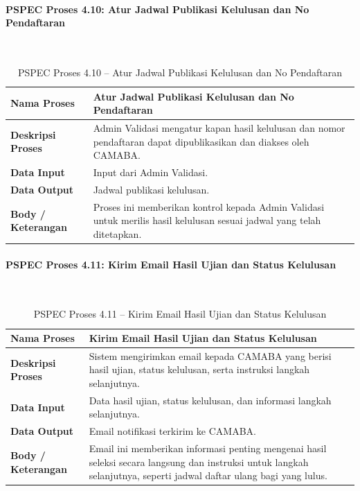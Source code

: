 \paragraph{PSPEC Proses 4.10: Atur Jadwal Publikasi Kelulusan dan No Pendaftaran}~\\
\begin{longtable}{|p{}|p{}|}
\caption{PSPEC Proses 4.10 -- Atur Jadwal Publikasi Kelulusan dan No Pendaftaran}
\label{table:3.pspec410}\\
\hline
\textbf{Nama Proses} & Atur Jadwal Publikasi Kelulusan dan No Pendaftaran \\
\hline
\textbf{Deskripsi Proses} & Admin Validasi mengatur kapan hasil kelulusan dan nomor pendaftaran dapat dipublikasikan dan diakses oleh CAMABA. \\
\hline
\textbf{Data Input} & Input dari Admin Validasi. \\
\hline
\textbf{Data Output} & Jadwal publikasi kelulusan. \\
\hline
\textbf{Body / Keterangan} & Proses ini memberikan kontrol kepada Admin Validasi untuk merilis hasil kelulusan sesuai jadwal yang telah ditetapkan. \\
\hline
\end{longtable}

\paragraph{PSPEC Proses 4.11: Kirim Email Hasil Ujian dan Status Kelulusan}~\\
\begin{longtable}{|p{}|p{}|}
	\caption{PSPEC Proses 4.11 -- Kirim Email Hasil Ujian dan Status Kelulusan}
	\label{table:3.pspec411}\\
	\hline
	\textbf{Nama Proses} & Kirim Email Hasil Ujian dan Status Kelulusan \\
	\hline
	\textbf{Deskripsi Proses} & Sistem mengirimkan email kepada CAMABA yang berisi hasil ujian, status kelulusan, serta instruksi langkah selanjutnya. \\
	\hline
	\textbf{Data Input} & Data hasil ujian, status kelulusan, dan informasi langkah selanjutnya. \\
	\hline
	\textbf{Data Output} & Email notifikasi terkirim ke CAMABA. \\
	\hline
	\textbf{Body / Keterangan} & Email ini memberikan informasi penting mengenai hasil seleksi secara langsung dan instruksi untuk langkah selanjutnya, seperti jadwal daftar ulang bagi yang lulus. \\
	\hline
\end{longtable}

